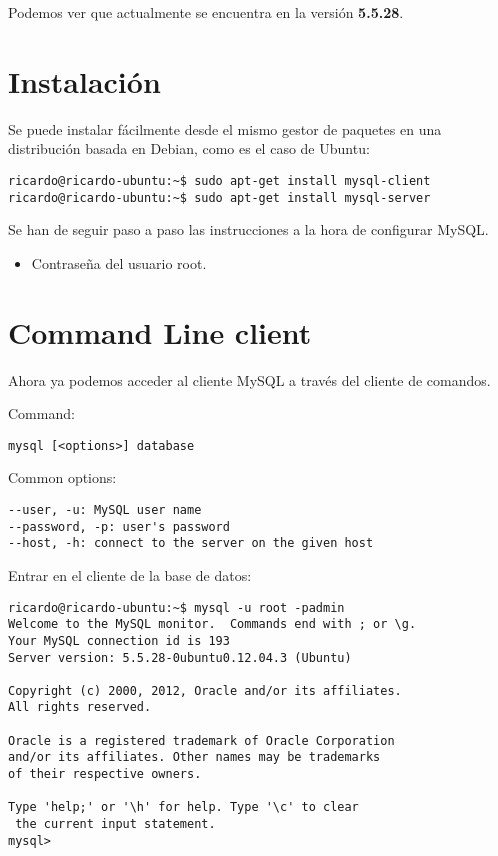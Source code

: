 \documentclass[11pt]{article}
\begin{document}
\par Podemos ver que actualmente se encuentra en la versión \textbf{5.5.28}.

\section{Instalaci\'on}

\par Se puede instalar f\'acilmente desde el mismo gestor de paquetes en una distribuci\'on basada en Debian, como es el caso de Ubuntu:

\begin{lstlisting}[style=Shell]
ricardo@ricardo-ubuntu:~$ sudo apt-get install mysql-client
ricardo@ricardo-ubuntu:~$ sudo apt-get install mysql-server
\end{lstlisting}

Se han de seguir paso a paso las instrucciones a la hora de configurar MySQL.

\begin{itemize}
	\item Contrase\~na del usuario root.
\end{itemize}

\section{Command Line client}
\label{sec:cl-client}

\par Ahora ya podemos acceder al cliente MySQL a través del cliente de comandos.

\par Command:
\begin{lstlisting}[style=Shell]
mysql [<options>] database
\end{lstlisting}

\par Common options:
\begin{lstlisting}[style=Shell]
--user, -u: MySQL user name
--password, -p: user's password
--host, -h: connect to the server on the given host
\end{lstlisting}

\par Entrar en el cliente de la base de datos:
\begin{lstlisting}[style=Shell]
ricardo@ricardo-ubuntu:~$ mysql -u root -padmin
Welcome to the MySQL monitor.  Commands end with ; or \g.
Your MySQL connection id is 193
Server version: 5.5.28-0ubuntu0.12.04.3 (Ubuntu)

Copyright (c) 2000, 2012, Oracle and/or its affiliates. 
All rights reserved.

Oracle is a registered trademark of Oracle Corporation 
and/or its affiliates. Other names may be trademarks 
of their respective owners.

Type 'help;' or '\h' for help. Type '\c' to clear
 the current input statement.
mysql>
\end{lstlisting}
\end{document}
